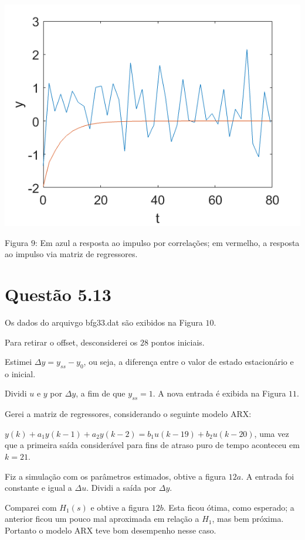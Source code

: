 \documentclass{rbfin}
\begin{document}
\newpage

\begin{center}
\includegraphics[scale=0.65]{2b4}

Figura $9$: Em azul a resposta ao impulso por correlações; em vermelho, a resposta ao impulso via matriz de regressores. 
\end{center}

\section*{Questão 5.13}

Os dados do arquivgo bfg33.dat são exibidos na Figura $10$.

Para retirar o offset, desconsiderei os $28$ pontos iniciais.

Estimei $\Delta y = y_{ss} - y_0$, ou seja, a diferença entre o valor de estado estacionário e o inicial.

Dividi $u$ e $y$ por $\Delta y$, a fim de que $y_{ss} = 1$. A nova entrada é exibida na Figura $11$.

Gerei a matriz de regressores, considerando o seguinte modelo ARX:

$y(k) + a_1 y(k-1) + a_2 y(k-2) = b_1 u(k - 19) + b_2 u(k - 20)$, uma vez que a primeira saída considerável para fins de atraso puro de tempo aconteceu em $k = 21$.

Fiz a simulação com os parâmetros estimados, obtive a figura $12a$. A entrada foi constante e igual a $\Delta u$. Dividi a saída por $\Delta y$.

Comparei com $H_1(s)$ e obtive a figura $12b$. Esta ficou ótima, como esperado; a anterior ficou um pouco mal aproximada em relação a $H_1$, mas bem próxima. Portanto o modelo ARX teve bom desempenho nesse caso.
\end{document}
